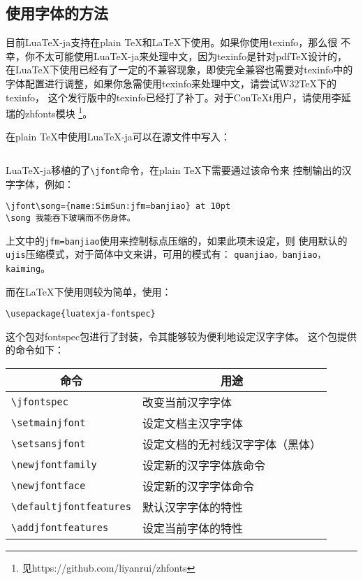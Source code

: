 \documentclass[DIV=13]{article}
\def\LuaTeX{Lua\TeX}
\begin{document}
\subsection{使用字体的方法}
目前\LuaTeX-ja支持在plain \TeX 和\LaTeX 下使用。如果你使用texinfo，那么很
不幸，你不太可能使用\LuaTeX-ja来处理中文，因为texinfo是针对pdf\TeX 设计的，
在\LuaTeX 下使用已经有了一定的不兼容现象，即使完全兼容也需要对texinfo中的
字体配置进行调整，如果你急需使用texinfo来处理中文，请尝试W32\TeX 下的texinfo，
这个发行版中的texinfo已经打了补丁。对于Con\TeX t用户，请使用李延瑞的zhfonts模块
\footnote{见https://github.com/liyanrui/zhfonts}。

在plain \TeX 中使用Lua\TeX-ja可以在源文件中写入：
\begin{verbatim}

\end{verbatim}
Lua\TeX-ja移植的了\verb!\jfont!命令，在plain \TeX 下需要通过该命令来
控制输出的汉字字体，例如：
\begin{verbatim}
\jfont\song={name:SimSun:jfm=banjiao} at 10pt
\song 我能吞下玻璃而不伤身体。
\end{verbatim}
上文中的\verb!jfm=banjiao!使用来控制标点压缩的，如果此项未设定，则
使用默认的\verb!ujis!压缩模式，对于简体中文来讲，可用的模式有：
\texttt{quanjiao，banjiao，kaiming}。

而在\LaTeX 下使用则较为简单，使用：
\begin{verbatim}
\usepackage{luatexja-fontspec}
\end{verbatim}
这个包对fontspec包进行了封装，令其能够较为便利地设定汉字字体。
这个包提供的命令如下：
\begin{table}[htbp]
  \centering
    \begin{tabular}{ll}
    \toprule
    \multicolumn{1}{c}{\textbf{命令}} & \multicolumn{1}{c}{\textbf{用途}} \\
    \midrule
    \verb!\jfontspec! & 改变当前汉字字体 \\
    \verb!\setmainjfont! & 设定文档主汉字字体 \\
    \verb!\setsansjfont! & 设定文档的无衬线汉字字体（黑体） \\
    \verb!\newjfontfamily! & 设定新的汉字字体族命令 \\
    \verb!\newjfontface! & 设定新的汉字字体命令 \\
    \verb!\defaultjfontfeatures! & 默认汉字字体的特性 \\
    \verb!\addjfontfeatures! & 设定当前字体的特性 \\
    \bottomrule
    \end{tabular}%
\end{table}%
\end{document}
